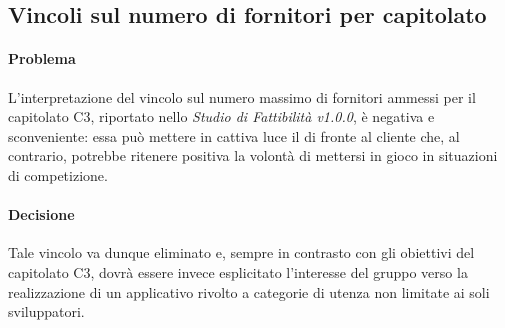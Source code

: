 \subsection{Vincoli sul numero di fornitori per capitolato}
\paragraph{Problema} L'interpretazione del vincolo sul numero massimo di fornitori ammessi per il capitolato C3, riportato nello \emph{Studio di Fattibilità v1.0.0}, è negativa e sconveniente: essa può mettere in cattiva luce il  di fronte al cliente che, al contrario, potrebbe ritenere positiva la volontà di mettersi in gioco in situazioni di competizione.
\paragraph{Decisione} Tale vincolo va dunque eliminato e, sempre in contrasto con gli obiettivi del capitolato C3, dovrà essere invece esplicitato l’interesse del gruppo verso la realizzazione di un applicativo rivolto a categorie di utenza non limitate ai soli sviluppatori.
